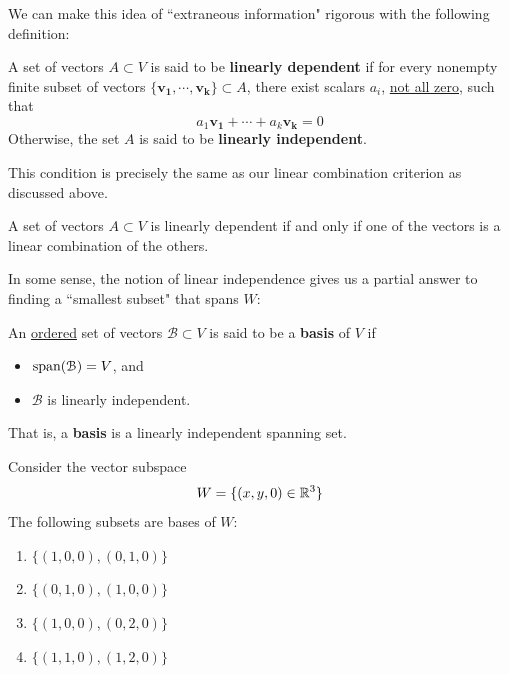     We can make this idea of ``extraneous information" rigorous with the following definition:
    
     \begin{definition}
    A set of vectors $A \subset V$ is said to be \textbf{linearly dependent} if for every nonempty finite subset of vectors $\{\bm{v_1}, \cdots, \bm{v_k}\} \subset A$, there exist scalars $a_i$, \underline{not all zero}, such that $$a_1\bm{v_1} + \cdots + a_k\bm{v_k} = 0$$ Otherwise, the set $A$ is said to be \textbf{linearly independent}.
    \end{definition}
    
    This condition is precisely the same as our linear combination criterion as discussed above. 
    
    \begin{proposition}
     A set of vectors $A \subset V$ is linearly dependent if and only if one of the vectors is a linear combination of the others.
    \end{proposition}
    
    In some sense, the notion of linear independence gives us a partial answer to finding a ``smallest subset" that spans $W$:
    
    \begin{definition}
    An \underline{ordered} set of vectors $\mathcal{B} \subset V$ is said to be a \textbf{basis} of $V$ if 
     \begin{itemize}
        \item $\textnormal{span}(\mathcal{B}) = V$, and 
        \item $\mathcal{B}$ is linearly independent.
    \end{itemize}
    
    That is, a \textbf{basis} is a linearly independent spanning set.
    \end{definition}
    
    \begin{example}
    Consider the vector subspace $$W = \{(x, y, 0) \in \mathbb{R}^3 \}$$
    The following subsets are bases of $W$:
    
    \begin{enumerate}[label=(\roman*)]
        \item $\{(1,0,0), (0,1,0)\}$
        \item $\{(0,1,0), (1,0,0)\}$
        \item $\{(1,0,0),(0,2,0)\}$
        \item $\{(1,1,0),(1,2,0)\}$
    \end{enumerate}
    \end{example}
    
